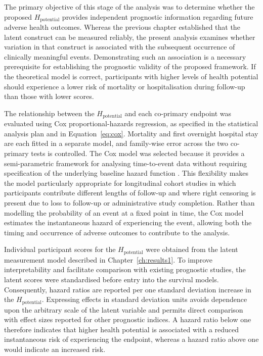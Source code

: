 \noindent The primary objective of this stage of the analysis was to determine whether the proposed $H_{\text{potential}}$ provides independent prognostic information regarding future adverse health outcomes. Whereas the previous chapter established that the latent construct can be measured reliably, the present analysis examines whether variation in that construct is associated with the subsequent occurrence of clinically meaningful events. Demonstrating such an association is a necessary prerequisite for establishing the prognostic validity of the proposed framework. If the theoretical model is correct, participants with higher levels of health potential should experience a lower risk of mortality or hospitalisation during follow-up than those with lower scores.

The relationship between the $H_{\text{potential}}$ and each co-primary endpoint was evaluated using Cox proportional-hazards regression, as specified in the statistical analysis plan and in Equation~\eqref{eq:cox}. Mortality and first overnight hospital stay are each fitted in a separate model, and family-wise error across the two co-primary tests is controlled. The Cox model was selected because it provides a semi-parametric framework for analysing time-to-event data without requiring specification of the underlying baseline hazard function \citep{cox_1972}. This flexibility makes the model particularly appropriate for longitudinal cohort studies in which participants contribute different lengths of follow-up and where right censoring is present due to loss to follow-up or administrative study completion. Rather than modelling the probability of an event at a fixed point in time, the Cox model estimates the instantaneous hazard of experiencing the event, allowing both the timing and occurrence of adverse outcomes to contribute to the analysis.

Individual participant scores for the $H_{\text{potential}}$ were obtained from the latent measurement model described in Chapter~\ref{ch:results1}. To improve interpretability and facilitate comparison with existing prognostic studies, the latent scores were standardised before entry into the survival models. Consequently, hazard ratios are reported per one standard deviation increase in the $H_{\text{potential}}$. Expressing effects in standard deviation units avoids dependence upon the arbitrary scale of the latent variable and permits direct comparison with effect sizes reported for other prognostic indices. A hazard ratio below one therefore indicates that higher health potential is associated with a reduced instantaneous risk of experiencing the endpoint, whereas a hazard ratio above one would indicate an increased risk.

